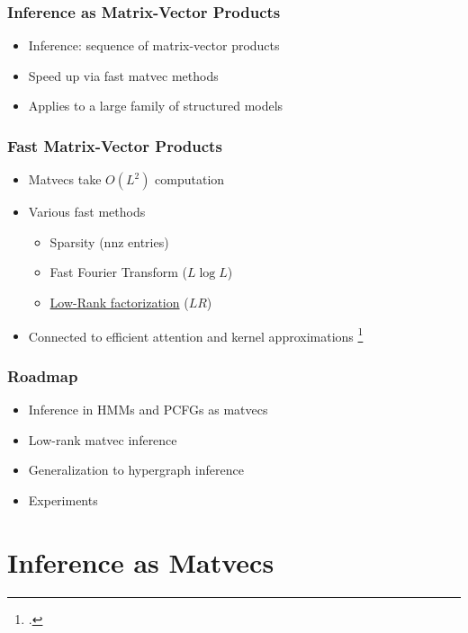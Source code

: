 \documentclass{beamer}
\begin{document}
\begin{frame}
\frametitle{Inference as Matrix-Vector Products}
\begin{itemize}
\item Inference: sequence of matrix-vector products
\vspace{1em}
\item Speed up via fast matvec methods 
\vspace{1em}
\item Applies to a large family of structured models
\end{itemize}
\end{frame}

\begin{frame}
\frametitle{Fast Matrix-Vector Products}
\begin{itemize}
\item Matvecs take $O(L^2)$ computation
\vspace{1em}
\item Various fast methods
    \begin{itemize}
    \item Sparsity (nnz entries)
    \item Fast Fourier Transform ($L \log L$)
    \item \underline{Low-Rank factorization} ($LR$)
    \end{itemize}
\vspace{1em}
\item Connected to efficient attention and kernel approximations
\footcite{performer,rfa,blanc2018adaptive}
\end{itemize}
\end{frame}

\begin{frame}
\frametitle{Roadmap}
\begin{itemize}
\item Inference in HMMs and PCFGs as matvecs
\vspace{1em}
\item Low-rank matvec inference
\vspace{1em}
\item Generalization to hypergraph inference
\vspace{1em}
\item Experiments
\end{itemize}
\end{frame}

\section{Inference as Matvecs}
\end{document}
